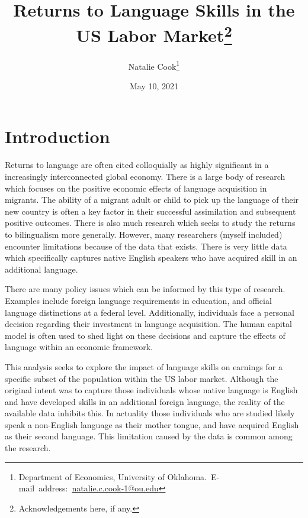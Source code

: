 \documentclass[12pt,english]{article}
\begin{document}
\begin{singlespace}
\title{Returns to Language Skills in the US Labor Market\thanks{Acknowledgements here, if any.}}
\end{singlespace}

\author{Natalie Cook\thanks{Department of Economics, University of Oklahoma.\
E-mail~address:~\href{mailto:student.name@ou.edu}{natalie.c.cook-1@ou.edu}}}

\date{May 10, 2021}

\maketitle


\vfill{}


\pagebreak{}


\section{Introduction}\label{sec:intro}
Returns to language are often cited colloquially as highly significant in a increasingly interconnected global economy. There is a large body of research which focuses on the positive economic effects of language acquisition in migrants. The ability of a migrant adult or child to pick up the language of their new country is often a key factor in their successful assimilation and subsequent positive outcomes. There is also much research which seeks to study the returns to bilingualism more generally. However, many researchers (myself included) encounter limitations because of the data that exists. There is very little data which specifically captures native English speakers who have acquired skill in an additional language.  

There are many policy issues which can be informed by this type of research. Examples include foreign language requirements in education, and official language distinctions at a federal level. Additionally, individuals face a personal decision regarding their investment in language acquisition. The human capital model is often used to shed light on these decisions and capture the effects of language within an economic framework. 

This analysis seeks to explore the impact of language skills on earnings for a specific subset of the population within the US labor market. Although the original intent was to capture those individuals whose native language is English and have developed skills in an additional foreign language, the reality of the available data inhibits this. In actuality those individuals who are studied likely speak a non-English language as their mother tongue, and have acquired English as their second language. This limitation caused by the data is common among the research.
\end{document}
